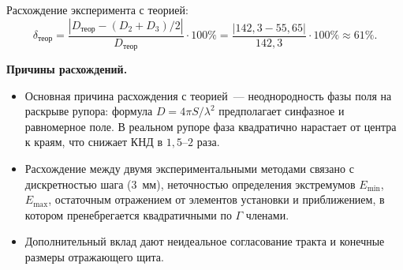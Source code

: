 Расхождение эксперимента с теорией:
\begin{equation}
	\delta_{\text{теор}} = \frac{|D_{\text{теор}} - (D_2 + D_3)/2|}{D_{\text{теор}}} \cdot 100\%
	= \frac{|142{,}3 - 55{,}65|}{142{,}3} \cdot 100\%
	\approx 61\%.
\end{equation}

\noindent\textbf{Причины расхождений.}
\begin{itemize}
	\item Основная причина расхождения с теорией~--- неоднородность фазы поля на раскрыве рупора: формула $D = 4\pi S/\lambda^2$ предполагает синфазное и равномерное поле. В реальном рупоре фаза квадратично нарастает от центра к краям, что снижает КНД в $1{,}5$--$2$ раза.
	\item Расхождение между двумя экспериментальными методами связано с дискретностью шага ($3$~мм), неточностью определения экстремумов $E_{\min}$, $E_{\max}$, остаточным отражением от элементов установки и приближением, в котором пренебрегается квадратичными по $\Gamma$ членами.
	\item Дополнительный вклад дают неидеальное согласование тракта и конечные размеры отражающего щита.
\end{itemize}